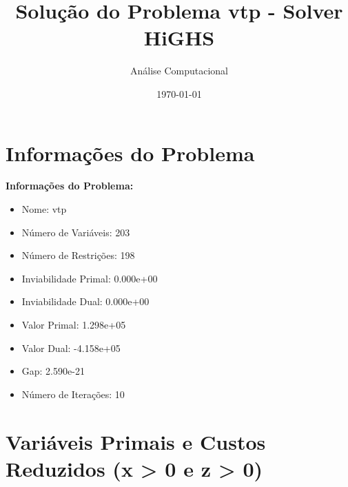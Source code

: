 \documentclass[12pt]{article}
\title{Solução do Problema vtp - Solver HiGHS}
\author{Análise Computacional}
\date{\today}
\begin{document}
\maketitle

\section{Informações do Problema}

\textbf{Informações do Problema:}
\begin{itemize}
\item Nome: vtp
\item Número de Variáveis: 203
\item Número de Restrições: 198
\item Inviabilidade Primal: 0.000e+00
\item Inviabilidade Dual: 0.000e+00
\item Valor Primal: 1.298e+05
\item Valor Dual: -4.158e+05
\item Gap: 2.590e-21
\item Número de Iterações: 10
\end{itemize}


\section{Variáveis Primais e Custos Reduzidos (x > 0 e z > 0)}
\end{document}
